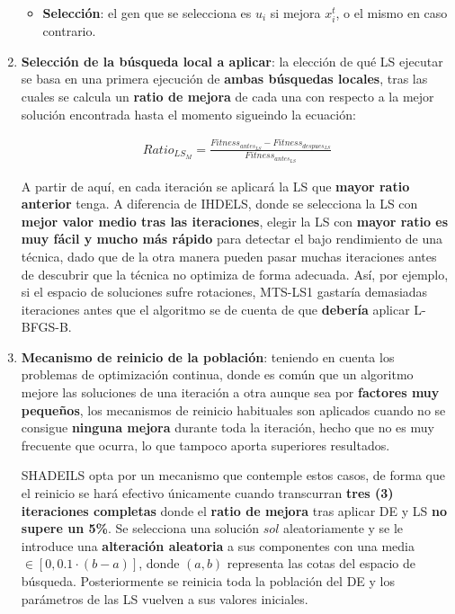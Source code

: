 \begin{enumerate}
\begin{itemize}
		\item \textbf{Selección}: el gen que se selecciona es $u_i$ si mejora $x_i^t$, o el mismo en caso contrario.
	\end{itemize}

	\item \label{algoSHADEILS:2}\textbf{Selección de la búsqueda local a aplicar}: la elección de qué LS ejecutar se basa en una primera ejecución de \textbf{ambas búsquedas locales}, tras las cuales se calcula un \textbf{ratio de mejora} de cada una con respecto a la mejor solución encontrada hasta el momento sigueindo la ecuación:
	
	 \begin{equation}\label{eq:LS-Seleccion}
	 	\begin{gathered}
			Ratio_{LS_M} = \frac{Fitness_{antes_{LS}} - Fitness_{despues_{LS}}}{Fitness_{antes_{LS}}}
		 \end{gathered}
	 \end{equation}
	 
	 A partir de aquí, en cada iteración se aplicará la LS que \textbf{mayor ratio anterior} tenga. A diferencia de IHDELS, donde se selecciona la LS con \textbf{mejor valor medio tras las iteraciones}, elegir la LS con \textbf{mayor ratio es muy fácil y mucho más rápido} para detectar el bajo rendimiento de una técnica, dado que de la otra manera pueden pasar muchas iteraciones antes de descubrir que la técnica no optimiza de forma adecuada. Así, por ejemplo, si el espacio de soluciones sufre rotaciones, MTS-LS1 gastaría demasiadas iteraciones antes que el algoritmo se de cuenta de que \textbf{debería} aplicar L-BFGS-B.
	 
	 \item \label{algSHADEILS:3} \textbf{Mecanismo de reinicio de la población}: teniendo en cuenta los problemas de optimización continua, donde es común que un algoritmo mejore las soluciones de una iteración a otra aunque sea por \textbf{factores muy pequeños}, los mecanismos de reinicio habituales son aplicados cuando no se consigue \textbf{ninguna mejora} durante toda la iteración, hecho que no es muy frecuente que ocurra, lo que tampoco aporta superiores resultados.
	 
	 SHADEILS opta por un mecanismo que contemple estos casos, de forma que el reinicio se hará efectivo únicamente cuando transcurran \textbf{tres (3) iteraciones completas} donde el \textbf{ratio de mejora} tras aplicar DE y LS \textbf{no supere un 5\%}. Se selecciona una solución $sol$ aleatoriamente y se le introduce una \textbf{alteración aleatoria} a sus componentes con una media $\in [0, 0.1\cdot (b-a)]$, donde $(a,b)$ representa las cotas del espacio de búsqueda. Posteriormente se reinicia toda la población del DE y los parámetros de las LS vuelven a sus valores iniciales.
	
\end{enumerate}

